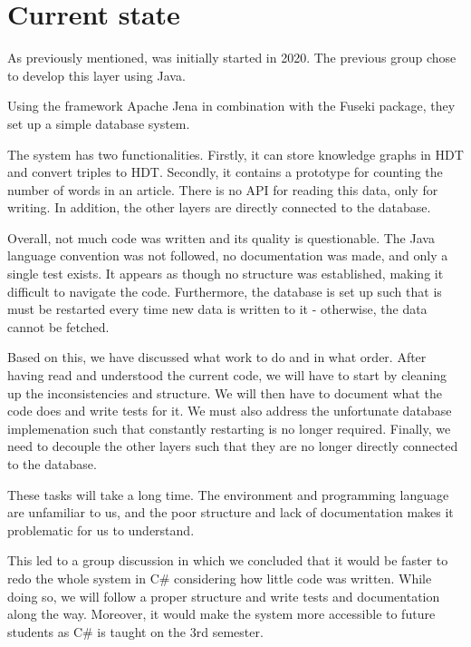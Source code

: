 \section{Current state}

As previously mentioned, \knox{} was initially started in 2020.
The previous group chose to develop this layer using Java.

Using the framework Apache Jena in combination with the Fuseki package, they set up a simple database system.

The system has two functionalities. 
Firstly, it can store knowledge graphs in HDT and convert triples to HDT.
Secondly, it contains a prototype for counting the number of words in an article.
There is no API for reading this data, only for writing. 
In addition, the other layers are directly connected to the database.

Overall, not much code was written and its quality is questionable. 
The Java language convention was not followed, no documentation was made, and only a single test exists. 
It appears as though no structure was established, making it difficult to navigate the code. 
Furthermore, the database is set up such that is must be restarted every time new data is written to it - otherwise, the data cannot be fetched.

Based on this, we have discussed what work to do and in what order.
After having read and understood the current code, we will have to start by cleaning up the inconsistencies and structure.
We will then have to document what the code does and write tests for it.
We must also address the unfortunate database implemenation such that constantly restarting is no longer required.
Finally, we need to decouple the other layers such that they are no longer directly connected to the database.

These tasks will take a long time.
The environment and programming language are unfamiliar to us, and the poor structure and lack of documentation makes it problematic for us to understand.

This led to a group discussion in which we concluded that it would be faster to redo the whole system in C# considering how little code was written. 
While doing so, we will follow a proper structure and write tests and documentation along the way. 
Moreover, it would make the system more accessible to future students as C# is taught on the 3rd semester.  
